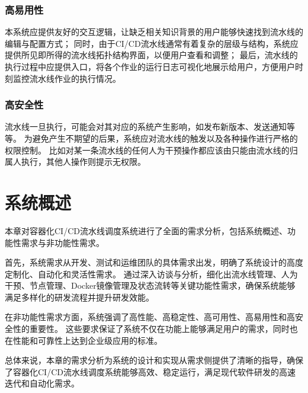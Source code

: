 \subsubsection{高易用性}
本系统应提供友好的交互逻辑，让缺乏相关知识背景的用户能够快速找到流水线的编辑与配置方式；
同时，由于CI/CD流水线通常有着复杂的层级与结构，系统应提供所见即所得的流水线拓扑结构界面，以便用户查看和调整；
最后，流水线的执行过程中应提供入口，将各个作业的运行日志可视化地展示给用户，方便用户时刻监控流水线作业的执行情况。

\subsubsection{高安全性}
流水线一旦执行，可能会对其对应的系统产生影响，如发布新版本、发送通知等等。
为避免产生不期望的后果，系统应对流水线的触发以及各种操作进行严格的权限控制。
比如对某一条流水线的任何人为干预操作都应该由只能由流水线的归属人执行，其他人操作则提示无权限。


\section{系统概述}

本章对容器化CI/CD流水线调度系统进行了全面的需求分析，包括系统概述、功能性需求与非功能性需求。

首先，系统需求从开发、测试和运维团队的具体需求出发，明确了系统设计的高度定制化、自动化和灵活性需求。
通过深入访谈与分析，细化出流水线管理、人为干预、节点管理、Docker镜像管理及状态流转等关键功能性需求，确保系统能够满足多样化的研发流程并提升研发效能。

在非功能性需求方面，系统强调了高性能、高稳定性、高可用性、高易用性和高安全性的重要性。
这些要求保证了系统不仅在功能上能够满足用户的需求，同时也在性能和可靠性上达到企业级应用的标准。

总体来说，本章的需求分析为系统的设计和实现从需求侧提供了清晰的指导，确保了容器化CI/CD流水线调度系统能够高效、稳定运行，满足现代软件研发的高速迭代和自动化需求。